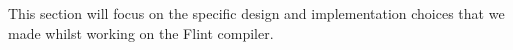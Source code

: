 This section will focus on the specific design and implementation choices that we made whilst working on the Flint compiler.
